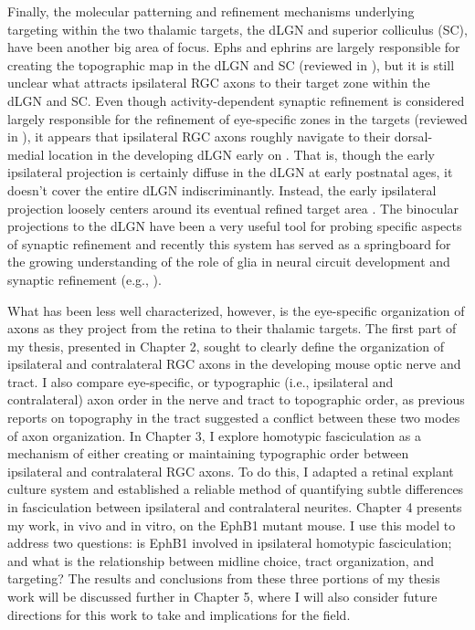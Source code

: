 Finally, the molecular patterning and refinement mechanisms underlying targeting within the two thalamic targets, the dLGN and superior colliculus (SC), have been another big area of focus.
Ephs and ephrins are largely responsible for creating the topographic map in the dLGN and SC (reviewed in \cite{erskine2014connecting}), but it is still unclear what attracts ipsilateral RGC axons to their target zone within the dLGN and SC.
Even though activity-dependent synaptic refinement is considered largely responsible for the refinement of eye-specific zones in the targets (reviewed in \cite{feller2009retinal}), it appears that ipsilateral RGC axons roughly navigate to their dorsal-medial location in the developing dLGN early on \cite{jaubert2005structural}.
That is, though the early ipsilateral projection is certainly diffuse in the dLGN at early postnatal ages, it doesn't cover the entire dLGN indiscriminantly.
Instead, the early ipsilateral projection loosely centers around its eventual refined target area \cite{jaubert2005structural}.
The binocular projections to the dLGN have been a very useful tool for probing specific aspects of synaptic refinement and recently this system has served as a springboard for the growing understanding of the role of glia in neural circuit development and synaptic refinement (e.g., \cite{chung2013astrocytes,schafer2012microglia}).

What has been less well characterized, however, is the eye-specific organization of axons as they project from the retina to their thalamic targets.
The first part of my thesis, presented in Chapter 2, sought to clearly define the organization of ipsilateral and contralateral RGC axons in the developing mouse optic nerve and tract.
I also compare eye-specific, or typographic (i.e., ipsilateral and contralateral) axon order in the nerve and tract to topographic order, as previous reports on topography in the tract suggested a conflict between these two modes of axon organization.
In Chapter 3, I explore homotypic fasciculation as a mechanism of either creating or maintaining typographic order between ipsilateral and contralateral RGC axons.
To do this, I adapted a retinal explant culture system and established a reliable method of quantifying subtle differences in fasciculation between ipsilateral and contralateral neurites.
Chapter 4 presents my work, in vivo and in vitro, on the EphB1 mutant mouse.
I use this model to address two questions: is EphB1 involved in ipsilateral homotypic fasciculation; and what is the relationship between midline choice, tract organization, and targeting?
The results and conclusions from these three portions of my thesis work will be discussed further in Chapter 5, where I will also consider future directions for this work to take and implications for the field.

